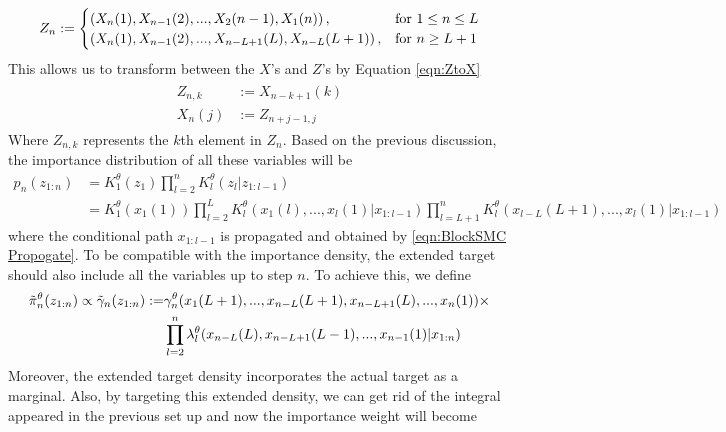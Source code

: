 \documentclass[12pt,a4paper]{article}
\begin{document}
\begin{equation*}
    Z_n := \begin{cases}
    \left(X_n(1),X_{n-1}(2),...,X_2(n-1),X_1(n)\right),& \textnormal{for}\ 1 \leq n \leq L \\
    \left(X_n(1),X_{n-1}(2),...,X_{n-L+1}(L),X_{n-L}(L+1)\right),& \textnormal{for}\ n \geq L+1
    \end{cases}
\end{equation*}
This allows us to transform between the $X$'s and $Z$'s by Equation \eqref{eqn:ZtoX}
\begin{align}
    \label{eqn:ZtoX}
    \begin{split}
    Z_{n,k} &:= X_{n-k+1}(k)\\
    X_n(j)  &:= Z_{n+j-1,j}
    \end{split}
\end{align}
Where $Z_{n,k}$ represents the $k$th element in $Z_n$. Based on the previous discussion, the importance distribution of all these variables will be 
\begin{equation*}
    \begin{split}
        p_n(z_{1:n}) &= K_1^{\theta}(z_1)\prod_{l=2}^n K_l^{\theta}(z_l|z_{1:l-1})\\
        &=K_1^{\theta}(x_1(1))\prod_{l=2}^L K_l^{\theta}(x_1(l),...,x_l(1)|x_{1:l-1})\prod_{l=L+1}^n K_l^{\theta}(x_{l-L}(L+1),...,x_l(1)|x_{1:l-1})
    \end{split}
\end{equation*}
where the conditional path $x_{1:l-1}$ is propagated and obtained by \eqref{eqn:BlockSMC Propogate}. To be compatible with the importance density, the extended target should also include all the variables up to step $n$. To achieve this, we define
\begin{equation}
\label{eqn:BlockSMC_ExtendedTarget}
    \begin{split}
        \Tilde{\pi}_n^{\theta}(z_{1:n}) \propto \Tilde{\gamma}_n(z_{1:n}) :=& \gamma_n^{\theta}(x_1(L+1),...,x_{n-L}(L+1),x_{n-L+1}(L),...,x_n(1))\times\\
        &\prod_{l=2}^n \lambda_l^{\theta}(x_{n-L}(L),x_{n-L+1}(L-1),...,x_{n-1}(1)|x_{1:n})
    \end{split}
\end{equation}
Moreover, the extended target density incorporates the actual target as a marginal. Also, by targeting this extended density, we can get rid of the integral appeared in the previous set up and now the importance weight will become 
\end{document}
